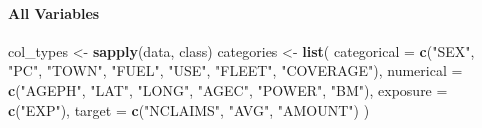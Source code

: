 \documentclass[
  english,
  11pt,
]{article}
\newenvironment{Shaded}{\begin{snugshade}}{\end{snugshade}}
\newcommand{\AttributeTok}[1]{\textcolor[rgb]{0.13,0.29,0.53}{#1}}
\newcommand{\FunctionTok}[1]{\textcolor[rgb]{0.13,0.29,0.53}{\textbf{#1}}}
\newcommand{\NormalTok}[1]{#1}
\newcommand{\OtherTok}[1]{\textcolor[rgb]{0.56,0.35,0.01}{#1}}
\newcommand{\StringTok}[1]{\textcolor[rgb]{0.31,0.60,0.02}{#1}}
\begin{document}
\paragraph{All Variables}\label{all-variables}

\begin{Shaded}
\begin{Highlighting}[]
\NormalTok{col\_types }\OtherTok{\textless{}{-}} \FunctionTok{sapply}\NormalTok{(data, class)}
\NormalTok{categories }\OtherTok{\textless{}{-}} \FunctionTok{list}\NormalTok{(}
    \AttributeTok{categorical =} \FunctionTok{c}\NormalTok{(}\StringTok{"SEX"}\NormalTok{, }\StringTok{"PC"}\NormalTok{, }\StringTok{"TOWN"}\NormalTok{, }\StringTok{"FUEL"}\NormalTok{, }\StringTok{"USE"}\NormalTok{, }\StringTok{"FLEET"}\NormalTok{, }\StringTok{"COVERAGE"}\NormalTok{),}
    \AttributeTok{numerical =} \FunctionTok{c}\NormalTok{(}\StringTok{"AGEPH"}\NormalTok{, }\StringTok{"LAT"}\NormalTok{, }\StringTok{"LONG"}\NormalTok{, }\StringTok{"AGEC"}\NormalTok{, }\StringTok{"POWER"}\NormalTok{, }\StringTok{"BM"}\NormalTok{),}
    \AttributeTok{exposure =} \FunctionTok{c}\NormalTok{(}\StringTok{"EXP"}\NormalTok{),}
    \AttributeTok{target =} \FunctionTok{c}\NormalTok{(}\StringTok{"NCLAIMS"}\NormalTok{, }\StringTok{"AVG"}\NormalTok{, }\StringTok{"AMOUNT"}\NormalTok{)}
\NormalTok{)}


\end{Highlighting}
\end{Shaded}
\end{document}
